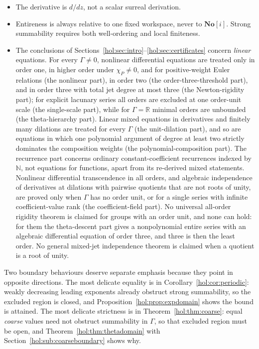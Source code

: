 \documentclass[11pt]{article}
\numberwithin{equation}{section}
\theoremstyle{definition}
\theoremstyle{remark}
\newcommand{\R}{\mathbb R}
\newcommand{\N}{\mathbb N}
\newcommand{\No}{\mathbf{No}}
\begin{document}
\begin{itemize}
nonzero, and distinct parameters have non-root-of-unity quotients; an
individual parameter may be $1$; the same holds for the multipliers of the
unit-dilation part. Section~\ref{hol:sec:torsion} and
Section~\ref{hol:ud:sub:examples} explain the failure when this quotient
condition is dropped.
\item The derivative is $d/dz$, not a scalar surreal derivation.
\item Entireness is always relative to one fixed workspace, never to
$\No[i]$. Strong summability requires both well-ordering and local finiteness.
\item The conclusions of
Sections~\ref{hol:sec:intro}--\ref{hol:sec:certificates} concern
\emph{linear} equations. For every $\Gamma\ne0$, nonlinear differential
equations are treated only in order one, in higher order under
$\chi_P\ne0$, and for positive-weight Euler relations (the nonlinear part),
in order two (the order-three-threshold part), and in order three with total
jet degree at most three (the Newton-rigidity part); for explicit lacunary
series all orders are excluded at one order-unit scale (the single-scale part),
while for $\Gamma=\R$ minimal orders are unbounded (the theta-hierarchy part).
Linear mixed equations in
derivatives and finitely many dilations are treated for every $\Gamma$ (the
unit-dilation part), and so are equations in which one polynomial argument of
degree at least two strictly dominates the composition weights (the
polynomial-composition part). The recurrence part concerns ordinary
constant-coefficient recurrences indexed by $\N$, not equations for
functions, apart from its re-derived mixed statements.
Nonlinear differential transcendence in all orders, and algebraic
independence of derivatives at dilations with pairwise quotients that are not
roots of unity, are proved only when $\Gamma$ has no order unit, or for a
single series with infinite coefficient-value rank (the coefficient-field
part). No universal all-order rigidity theorem is claimed for groups with an
order unit, and none can hold: for them the theta-descent part gives a
nonpolynomial entire series with an algebraic differential equation of
order three, and three is then the least order. No general mixed-jet
independence theorem is claimed when
a quotient is a root of unity.
\end{itemize}

Two boundary behaviours deserve separate emphasis because they point in
opposite directions. The most delicate equality is in
Corollary~\ref{hol:cor:periodic}: weakly decreasing leading exponents already
obstruct strong summability, so the excluded region is closed, and
Proposition~\ref{hol:prop:expdomain} shows the bound is attained. The most
delicate strictness is in Theorem~\ref{hol:thm:coarse}: equal \emph{coarse}
values need not obstruct summability in $\Gamma$, so that excluded region must
be open, and Theorem~\ref{hol:thm:thetadomain} with
Section~\ref{hol:sub:coarseboundary} shows why.
\end{document}

